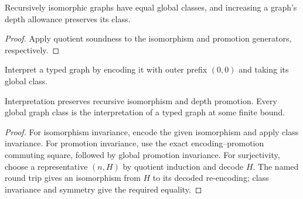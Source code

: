 



\begin{lemma}
Recursively isomorphic graphs have equal global classes, and increasing a
graph's depth allowance preserves its class.
\end{lemma}
\begin{proof}
Apply quotient soundness to the isomorphism and promotion generators,
respectively.
\end{proof}


\begin{definition}[Interpretation]
Interpret a typed graph by encoding it with outer prefix $(0,0)$ and taking
its global class.
\end{definition}

\begin{proposition}
Interpretation preserves recursive isomorphism and depth promotion. Every
global graph class is the interpretation of a typed graph at some finite bound.
\end{proposition}
\begin{proof}
For isomorphism invariance, encode the given isomorphism and apply class
invariance. For promotion invariance, use the exact encoding--promotion
commuting square, followed by global promotion invariance. For surjectivity,
choose a representative $(n,H)$ by quotient induction and decode $H$.
The named round trip gives an isomorphism from $H$ to its decoded re-encoding;
class invariance and symmetry give the required equality.
\end{proof}



